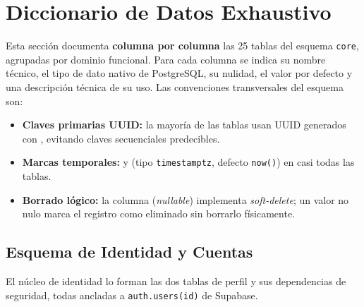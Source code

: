 \section{Diccionario de Datos Exhaustivo}
\label{sec:diccionario}

Esta sección documenta \textbf{columna por columna} las 25 tablas del esquema
\texttt{core}, agrupadas por dominio funcional. Para cada columna se indica su nombre
técnico, el tipo de dato nativo de PostgreSQL, su nulidad, el valor por defecto y una
descripción técnica de su uso. Las convenciones transversales del esquema son:

\begin{itemize}[noitemsep]
    \item \textbf{Claves primarias UUID:} la mayoría de las tablas usan UUID generados
    con , evitando claves secuenciales predecibles.
    \item \textbf{Marcas temporales:}  y 
    (tipo \texttt{timestamptz}, defecto \texttt{now()}) en casi todas las tablas.
    \item \textbf{Borrado lógico:} la columna  (\textit{nullable})
    implementa \textit{soft-delete}; un valor no nulo marca el registro como eliminado
    sin borrarlo físicamente.
\end{itemize}

\subsection{Esquema de Identidad y Cuentas}
\label{subsec:dic_identidad}

El núcleo de identidad lo forman las dos tablas de perfil y sus dependencias de
seguridad, todas ancladas a \texttt{auth.users(id)} de Supabase.

